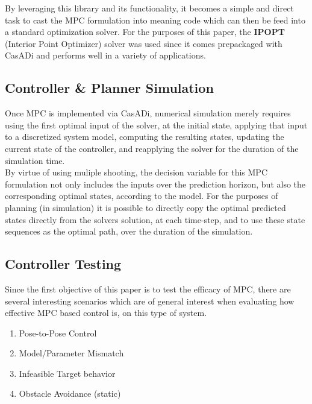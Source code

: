 \documentclass[journal]{IEEEtran}
\begin{document}
By leveraging this library and its functionality, it becomes a simple and direct task to cast the MPC formulation into meaning code which can then be feed into a standard optimization solver. For the purposes of this paper, the \textbf{IPOPT} (Interior Point Optimizer) solver was used since it comes prepackaged with CasADi and performs well in a variety of applications.

\subsection{Controller \& Planner Simulation}

Once MPC is implemented via CasADi, numerical simulation merely requires using the first optimal input of the solver, at the initial state, applying that input to a discretized system model, computing the resulting states, updating the current state of the controller, and reapplying the solver for the duration of the simulation time.\\

By virtue of using muliple shooting, the decision variable for this MPC formulation not only includes the inputs over the prediction horizon, but also the corresponding optimal states, according to the model. For the purposes of planning (in simulation) it is possible to directly copy the optimal predicted states directly from the solvers solution, at each time-step, and to use these state sequences as the optimal path, over the duration of the simulation.

\subsection{Controller Testing}

Since the first objective of this paper is to test the efficacy of MPC, there are several interesting scenarios which are of general interest when evaluating how effective MPC based control is, on this type of system. \\



\begin{enumerate}
    \item Pose-to-Pose Control
    \item Model/Parameter Mismatch
    \item Infeasible Target behavior
    \item Obstacle Avoidance (static)
\end{enumerate}
\end{document}
